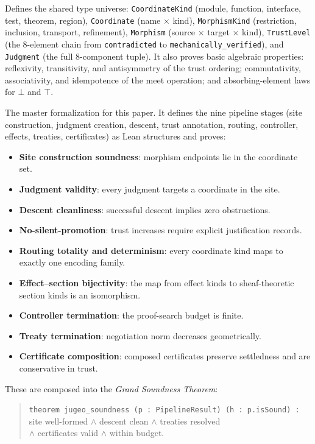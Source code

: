 \begin{description}[leftmargin=1.5em,style=nextline]
\item[\texttt{Common.lean}]
  Defines the shared type universe:
  \texttt{CoordinateKind} (module, function, interface, test, theorem,
  region),
  \texttt{Coordinate} (name $\times$ kind),
  \texttt{MorphismKind} (restriction, inclusion, transport, refinement),
  \texttt{Morphism} (source $\times$ target $\times$ kind),
  \texttt{TrustLevel} (the 8-element chain from \texttt{contradicted}
  to \texttt{mechanically\_verified}),
  and \texttt{Judgment} (the full 8-component tuple).
  It also proves basic algebraic properties: reflexivity, transitivity,
  and antisymmetry of the trust ordering; commutativity, associativity,
  and idempotence of the meet operation; and absorbing-element laws for
  $\bot$ and $\top$.

\item[\texttt{Paper00\_Seminal.lean}]
  The master formalization for this paper.  It defines the
  nine pipeline stages (site construction, judgment creation, descent,
  trust annotation, routing, controller, effects, treaties, certificates)
  as Lean structures and proves:
  \begin{itemize}[leftmargin=1em]
    \item \textbf{Site construction soundness}: morphism endpoints lie in
      the coordinate set.
    \item \textbf{Judgment validity}: every judgment targets a
      coordinate in the site.
    \item \textbf{Descent cleanliness}: successful descent implies zero
      obstructions.
    \item \textbf{No-silent-promotion}: trust increases require
      explicit justification records.
    \item \textbf{Routing totality and determinism}: every coordinate
      kind maps to exactly one encoding family.
    \item \textbf{Effect--section bijectivity}: the map from
      \Python{} effect kinds to sheaf-theoretic section kinds is
      an isomorphism.
    \item \textbf{Controller termination}: the proof-search budget
      is finite.
    \item \textbf{Treaty termination}: negotiation norm decreases
      geometrically.
    \item \textbf{Certificate composition}: composed certificates
      preserve settledness and are conservative in trust.
  \end{itemize}
  These are composed into the \emph{Grand Soundness Theorem}:
  \begin{quote}
    \texttt{theorem jugeo\_soundness (p : PipelineResult) (h : p.isSound) :}\\
    \quad site well-formed $\wedge$ descent clean $\wedge$ treaties resolved\\
    \quad $\wedge$ certificates valid $\wedge$ within budget.
  \end{quote}


\end{description}
